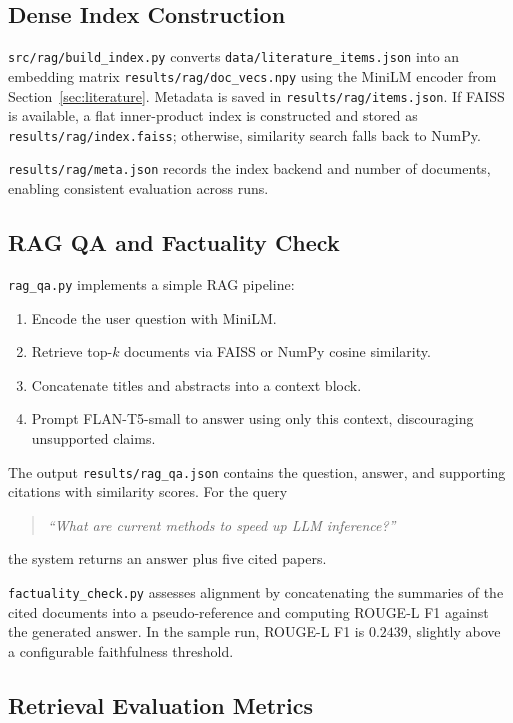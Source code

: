 \documentclass[11pt]{article}
\begin{document}
\subsection{Dense Index Construction}

\verb|src/rag/build_index.py| converts \verb|data/literature_items.json| into an embedding matrix \verb|results/rag/doc_vecs.npy| using the MiniLM encoder from Section~\ref{sec:literature}. Metadata is saved in \verb|results/rag/items.json|. If FAISS is available, a flat inner-product index is constructed and stored as \verb|results/rag/index.faiss|; otherwise, similarity search falls back to NumPy.

\verb|results/rag/meta.json| records the index backend and number of documents, enabling consistent evaluation across runs.

\subsection{RAG QA and Factuality Check}

\verb|rag_qa.py| implements a simple RAG pipeline:

\begin{enumerate}[leftmargin=1.5em]
\item Encode the user question with MiniLM.
\item Retrieve top-$k$ documents via FAISS or NumPy cosine similarity.
\item Concatenate titles and abstracts into a context block.
\item Prompt FLAN-T5-small to answer using only this context, discouraging unsupported claims.
\end{enumerate}

The output \verb|results/rag_qa.json| contains the question, answer, and supporting citations with similarity scores. For the query
\begin{quote}
\emph{``What are current methods to speed up LLM inference?''}
\end{quote}
the system returns an answer plus five cited papers.

\verb|factuality_check.py| assesses alignment by concatenating the summaries of the cited documents into a pseudo-reference and computing ROUGE-L F1 against the generated answer. In the sample run, ROUGE-L F1 is $0.2439$, slightly above a configurable faithfulness threshold.

\subsection{Retrieval Evaluation Metrics}
\end{document}
